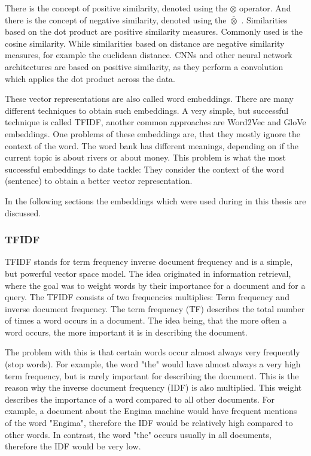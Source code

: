 \documentclass[draft,final,oneside]{vutinfth} %
\begin{document}
There is the concept of positive similarity, denoted using the $\otimes$ operator. And there is the concept of negative similarity, denoted using the $\overline{\otimes}$ \cite{TUW-233295}. Similarities based on the dot product are positive similarity measures. Commonly used is the cosine similarity. While similarities based on distance are negative similarity measures, for example the euclidean distance. CNNs and other neural network architectures are based on positive similarity, as they perform a convolution which applies the dot product across the data.

These vector representations are also called word embeddings. There are many different techniques to obtain such embeddings. A very simple, but successful technique is called TFIDF, another common approaches are Word2Vec and GloVe embeddings. One problems of these embeddings are, that they mostly ignore the context of the word. The word bank has different meanings, depending on if the current topic is about rivers or about money. This problem is what the most successful embeddings to date tackle: They consider the context of the word (sentence) to obtain a better vector representation.

In the following sections the embeddings which were used during in this thesis are discussed.

\subsubsection{TFIDF}
TFIDF stands for term frequency inverse document frequency and is a simple, but powerful vector space model. The idea originated in information retrieval, where the goal was to weight words by their importance for a document and for a query. The TFIDF consists of two frequencies multiplies: Term frequency and inverse document frequency. The term frequency (TF) describes the total number of times a word occurs in a document. The idea being, that the more often a word occurs, the more important it is in describing the document.

The problem with this is that certain words occur almost always very frequently (stop words). For example, the word "the" would have almost always a very high term frequency, but is rarely important for describing the document. This is the reason why the inverse document frequency (IDF) is also multiplied. This weight describes the importance of a word compared to all other documents. For example, a document about the Engima machine would have frequent mentions of the word "Engima", therefore the IDF would be relatively high compared to other words. In contrast, the word "the" occurs usually in all documents, therefore the IDF would be very low.
\end{document}
